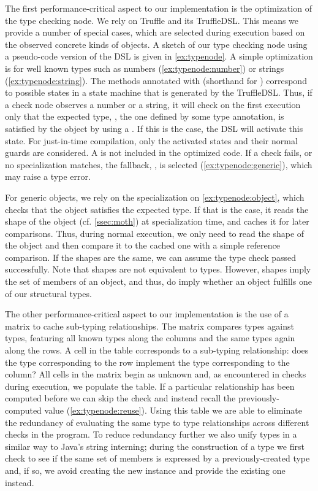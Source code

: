 The first performance-critical aspect to our implementation
is the optimization of the type checking node.
We rely on Truffle and its TruffleDSL\citep{humer2014domainspecific}.
This means we provide a number of special cases,
which are selected during execution based on the observed concrete 
kinds of objects.
A sketch of our type checking node using a pseudo-code version of the DSL
is given in \cref{ex:typenode}.
A simple optimization is for well known types such as
numbers (\cref{ex:typenode:number}) or strings (\cref{ex:typenode:string}).
The methods annotated with  (shorthand for )
correspond to possible states in a state machine that is generated by the
TruffleDSL.
Thus, if a check node observes a number or a string,
it will check on the first execution only that the expected type,
\ie, the one defined by some type annotation,
is satisfied by the object by using a .
If this is the case, the DSL will activate this state.
For just-in-time compilation, only the activated states and their normal guards are considered.
A  is not included in the optimized code.
If a check fails, or no specialization matches, the fallback,
\ie,  is selected (\cref{ex:typenode:generic}),
which may raise a type error.

For generic objects, we rely on the specialization on \cref{ex:typenode:object},
which checks that the object satisfies the expected type.
If that is the case, it reads the shape of the object (cf. \cref{ssec:moth}) at specialization time,
and caches it for later comparisons.
Thus, during normal execution,
we only need to read the shape of the object and then compare it to the cached one
with a simple reference comparison.
If the shapes are the same, we can assume the type check passed successfully.
Note that shapes are not equivalent to types.
However, shapes imply the set of members of an object, and thus,
do imply whether an object fulfills one of our structural types.

The other performance-critical aspect to our implementation
is the use of a matrix to cache sub-typing relationships.
The matrix compares types against types,
featuring all known types along the columns and the same types again along the rows.
A cell in the table corresponds to a sub-typing relationship:
does the type corresponding to the row implement
the type corresponding to the column?
All cells in the matrix begin as unknown and, as
encountered in checks during execution, we populate the table.
If a particular relationship has been computed before
we can skip the check and instead recall the previously-computed value
(\cref{ex:typenode:reuse}).
Using this table we are able to eliminate the redundancy of evaluating
the same type to type relationships across different checks in the program. To reduce redundancy further we also unify types in a similar way to Java's string interning; 
during the construction of a type we first check to see if the same
set of members is expressed by a previously-created type and, if so,
we avoid creating the new instance and provide the existing one instead.


